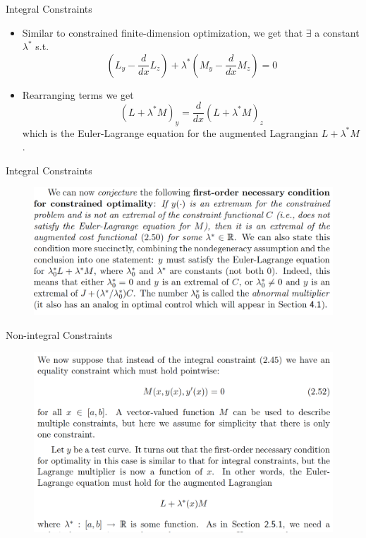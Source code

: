 \documentclass{beamer}
\begin{document}
\begin{frame}{Integral Constraints}
    \begin{itemize}
         \item Similar to constrained finite-dimension optimization, we get that $\exists$ a constant $\lambda^*$ s.t.
         \begin{equation}
             (L_y - \frac{d}{dx}L_z) + \lambda^*(M_y - \frac{d}{dx}M_z)=0
         \end{equation}
         \item Rearranging terms we get
         \begin{equation}
             (L + \lambda^*M)_y = \frac{d}{dx}(L + \lambda^*M)_z
         \end{equation}
         which is the Euler-Lagrange equation for the augmented Lagrangian $L + \lambda^* M$.
    \end{itemize}
\end{frame}

\begin{frame}{Integral Constraints}
    \begin{figure}
        \centering
        \includegraphics[width=\linewidth]{ch2/fig26.png}
    \end{figure}
\end{frame}

\begin{frame}{Non-integral Constraints}
    \begin{figure}
        \centering
        \includegraphics[width=\linewidth]{ch2/fig27.png}
    \end{figure}
\end{frame}
\end{document}
